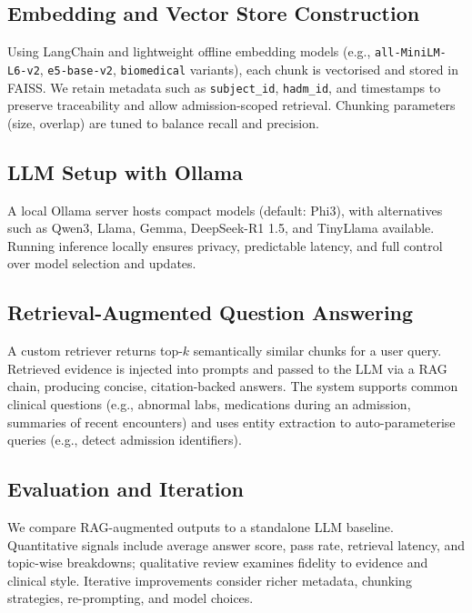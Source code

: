\subsection{Embedding and Vector Store Construction}
Using LangChain and lightweight offline embedding models (e.g., \texttt{all-MiniLM-L6-v2}, \texttt{e5-base-v2}, \texttt{biomedical} variants), each chunk is vectorised and stored in FAISS. We retain metadata such as \texttt{subject\_id}, \texttt{hadm\_id}, and timestamps to preserve traceability and allow admission-scoped retrieval. Chunking parameters (size, overlap) are tuned to balance recall and precision.

\subsection{LLM Setup with Ollama}
A local Ollama server hosts compact models (default: Phi3), with alternatives such as Qwen3, Llama, Gemma, DeepSeek-R1 1.5, and TinyLlama available. Running inference locally ensures privacy, predictable latency, and full control over model selection and updates.

\subsection{Retrieval-Augmented Question Answering}
A custom retriever returns top-$k$ semantically similar chunks for a user query. Retrieved evidence is injected into prompts and passed to the LLM via a RAG chain, producing concise, citation-backed answers. The system supports common clinical questions (e.g., abnormal labs, medications during an admission, summaries of recent encounters) and uses entity extraction to auto-parameterise queries (e.g., detect admission identifiers).

\subsection{Evaluation and Iteration}
We compare RAG-augmented outputs to a standalone LLM baseline. Quantitative signals include average answer score, pass rate, retrieval latency, and topic-wise breakdowns; qualitative review examines fidelity to evidence and clinical style. Iterative improvements consider richer metadata, chunking strategies, re-prompting, and model choices.
\newpage

